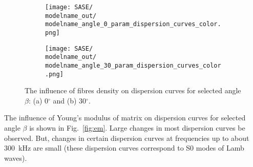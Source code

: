 \documentclass[preprint,12pt]{elsarticle}
\begin{document}
\begin{figure} [h!]
	\centering
	\newcommand{\modelname}{SASE3_plain_weave}
	\begin{subfigure}[b]{0.49\textwidth}
		\centering
		\texttt{[image: SASE/\\modelname\_out/\\modelname\_angle\_0\_param\_dispersion\_curves\_color.png]}
		\caption{}
		\label{fig:rhof0}
	\end{subfigure}
	\hfill
	\begin{subfigure}[b]{0.49\textwidth}
		\centering
		\texttt{[image: SASE/\\modelname\_out/\\modelname\_angle\_30\_param\_dispersion\_curves\_color.png]}
		\caption{}
		\label{fig:rhof30}
	\end{subfigure}
	\caption{The influence of fibres density on dispersion curves for selected angle $\beta$: (a) 0$^{\circ}$ and (b) 30$^{\circ}$.} 
	\label{fig:rhof}
\end{figure}

The influence of Young's modulus of matrix on dispersion curves for selected angle $\beta$ is shown in Fig.~\ref{fig:em}. Large changes in most dispersion curves be observed. But, changes in certain dispersion curves at frequencies up to about 300~kHz are small (these dispersion curves correspond to S0 modes of Lamb waves).
\end{document}
